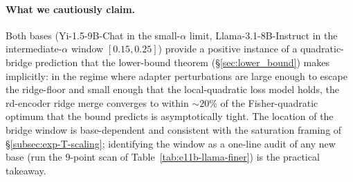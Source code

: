 \paragraph{What we cautiously claim.}
Both bases (Yi-1.5-9B-Chat in the small-$\alpha$ limit,
Llama-3.1-8B-Instruct in the intermediate-$\alpha$ window $[0.15,
0.25]$) provide a positive instance of a quadratic-bridge prediction
that the lower-bound theorem (\S\ref{sec:lower_bound}) makes
implicitly: in the regime where adapter perturbations are large
enough to escape the ridge-floor and small enough that the
local-quadratic loss model holds, the rd-encoder ridge merge
converges to within $\sim 20\%$ of the Fisher-quadratic optimum that
the bound predicts is asymptotically tight. The location of the
bridge window is base-dependent and consistent with the
saturation framing of \S\ref{subsec:exp-T-scaling}; identifying the
window as a one-line audit of any new base (run the $9$-point scan
of Table~\ref{tab:e11b-llama-finer}) is the practical takeaway.

